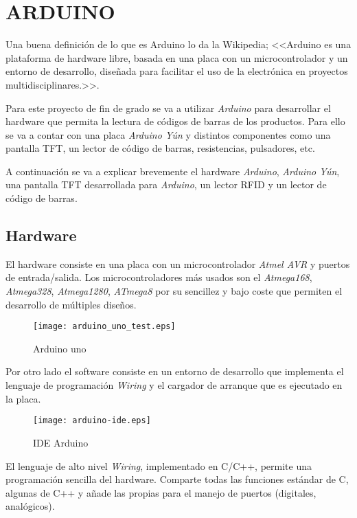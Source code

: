 \section{ARDUINO}

Una buena definición de lo que es Arduino lo da la Wikipedia; <<Arduino es una plataforma de hardware libre, basada en una placa con un microcontrolador y un entorno de desarrollo, diseñada para facilitar el uso de la electrónica en proyectos multidisciplinares.>>.

Para este proyecto de fin de grado se va a utilizar \emph{Arduino} para desarrollar el hardware que permita la lectura de códigos de barras de los productos. Para ello se va a contar con una placa \emph{Arduino Yún} y distintos componentes como una pantalla TFT, un lector de código de barras, resistencias, pulsadores, etc.

A continuación se va a explicar brevemente el hardware \emph{Arduino}, \emph{Arduino Yún}, una pantalla TFT desarrollada para \emph{Arduino}, un lector RFID y un lector de código de barras.

\subsection{Hardware}

El hardware consiste en una placa con un microcontrolador \emph{Atmel AVR} y puertos de entrada/salida. Los microcontroladores más usados son el \emph{Atmega168}, \emph{Atmega328}, \emph{Atmega1280}, \emph{ATmega8} por su sencillez y bajo coste que permiten el desarrollo de múltiples diseños.

\begin{figure}[H]
    \centering
    \texttt{[image: arduino\_uno\_test.eps]}
    \caption{Arduino uno}\label{fig:arduino_uno_test}
\end{figure}


Por otro lado el software consiste en un entorno de desarrollo que implementa el lenguaje de programación \emph{Wiring} y el cargador de arranque que es ejecutado en la placa.

\begin{figure}[H]
    \centering
    \texttt{[image: arduino-ide.eps]}
    \caption{IDE Arduino}\label{fig:arduino-ide}
\end{figure}

El lenguaje de alto nivel \emph{Wiring}, implementado en C/C++, permite una programación sencilla del hardware. Comparte todas las funciones estándar de C, algunas de C++ y añade las propias para el manejo de puertos (digitales, analógicos).

